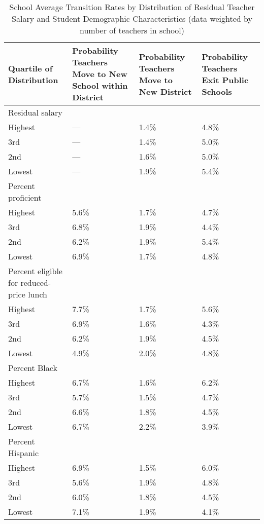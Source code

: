 \documentclass[]{article}
\begin{document}
\begin{table}[ht]
\centering
\begin{tabular}{p{}p{}p{}p{}}
  \hline
Quartile of Distribution & Probability Teachers Move to New School within District & Probability Teachers Move to New District & Probability Teachers Exit Public Schools \\ 
  \hline
Residual salary & & & \\
\quad Highest & --- & 1.4\% & 4.8\% \\ 
  \quad 3rd & --- & 1.4\% & 5.0\% \\ 
  \quad 2nd & --- & 1.6\% & 5.0\% \\ 
  \quad Lowest & --- & 1.9\% & 5.4\% \\ 
Percent proficient & & & \\
  \quad Highest & 5.6\% & 1.7\% & 4.7\% \\ 
  \quad 3rd & 6.8\% & 1.9\% & 4.4\% \\ 
  \quad 2nd & 6.2\% & 1.9\% & 5.4\% \\ 
  \quad Lowest & 6.9\% & 1.7\% & 4.8\% \\ 
Percent eligible for reduced-price lunch & & & \\
  \quad Highest & 7.7\% & 1.7\% & 5.6\% \\ 
  \quad 3rd & 6.9\% & 1.6\% & 4.3\% \\ 
  \quad 2nd & 6.2\% & 1.9\% & 4.5\% \\ 
  \quad Lowest & 4.9\% & 2.0\% & 4.8\% \\ 
Percent Black & & & \\
  \quad Highest & 6.7\% & 1.6\% & 6.2\% \\ 
  \quad 3rd & 5.7\% & 1.5\% & 4.7\% \\ 
  \quad 2nd & 6.6\% & 1.8\% & 4.5\% \\ 
  \quad Lowest & 6.7\% & 2.2\% & 3.9\% \\ 
Percent Hispanic & & & \\
  \quad Highest & 6.9\% & 1.5\% & 6.0\% \\ 
  \quad 3rd & 5.6\% & 1.9\% & 4.8\% \\ 
  \quad 2nd & 6.0\% & 1.8\% & 4.5\% \\ 
  \quad Lowest & 7.1\% & 1.9\% & 4.1\% \\ 
   \hline
\end{tabular}
\caption{School Average Transition Rates by Distribution of Residual Teacher Salary and Student Demographic Characteristics (data weighted by number of teachers in school)} 
\label{tbl:change_by_quartile}
\end{table}
\end{document}
